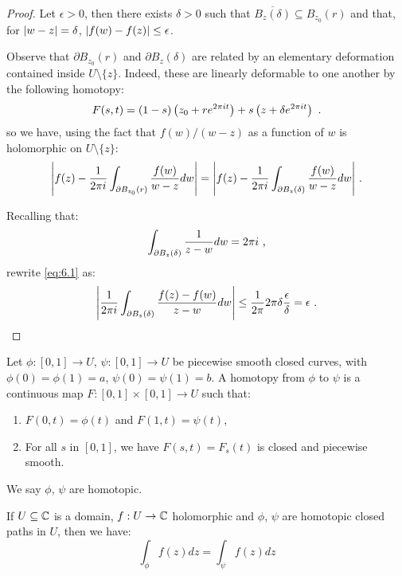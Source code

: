 \begin{proof}
  Let $\epsilon > 0$, then there exists $\delta > 0$ such that $\overline{B_z(\delta)} \subseteq B_{z_0}(r)$ and that, for $\abs{w - z} = \delta$, $\abs{f(w) - f(z)} \leq \epsilon$.

Observe that $\partial B_{z_0}(r)$ and $\partial B_z(\delta)$ are related by an elementary deformation contained inside $U \setminus \{z\}$. 
Indeed, these are linearly deformable to one another by the following homotopy:
\[
F(s, t) = (1 - s)\left(z_0 + re^{2\pi{}it}\right) + s\left(z + \delta e^{2\pi i t}\right) \mpunct{.}
\]
so we have, using the fact that $f(w)/(w - z)$ as a function of $w$ is holomorphic on $U \setminus \{z\}$:
\begin{equation}
  \label{eq:6.1}
  \abs*{f(z) - \frac{1}{2\pi i}\int_{\partial B_{z_0}(r)} \frac{f(w)}{w - z} dw} = \abs*{f(z) - \frac{1}{2 \pi i} \int_{\partial B_z(\delta)} \frac{f(w)}{w - z}dw} \mpunct{.}
\end{equation}

Recalling that:
\[
\int_{\partial B_z(\delta)} \frac{1}{z - w} dw = 2 \pi i \mpunct{,}
\]
rewrite \eqref{eq:6.1} as:
\[
\abs*{\frac{1}{2 \pi i} \int_{\partial B_z(\delta)} \frac{f(z) - f(w)}{z - w} dw} \leq \frac{1}{2 \pi} 2 \pi \delta \frac{\epsilon}{\delta} = \epsilon \mpunct{.}
\]
\end{proof}

\begin{definition}
  Let $\phi : [0, 1] \rightarrow U$, $\psi : [0, 1] \rightarrow U$ be piecewise smooth closed curves, with $\phi(0) = \phi(1) = a$, $\psi(0) = \psi(1) = b$. 
A homotopy from $\phi$ to $\psi$ is a continuous map $F : [0, 1] \times [0, 1] \rightarrow U$ such that:
\begin{enumerate}
\item $F(0, t) = \phi(t)$ and $F(1, t) = \psi(t)$,
\item For all $s$ in $[0, 1]$, we have $F(s, t) = F_s(t)$ is closed and piecewise smooth.
\end{enumerate}
We say $\phi$, $\psi$ are homotopic.
\end{definition}

\begin{proposition}
  If $U \subseteq \CC$ is a domain, $f : U \rightarrow \CC$ holomorphic and $\phi$, $\psi$ are homotopic closed paths in $U$, then we have:
\[
\int_\phi f(z) dz = \int_\psi f(z) dz
\]
\end{proposition}


